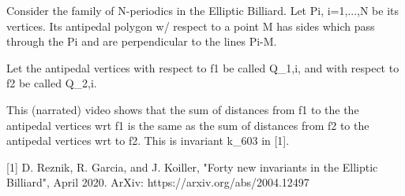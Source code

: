 Consider the family of N-periodics in the Elliptic Billiard. Let Pi, i=1,...,N be its vertices. Its antipedal polygon w/ respect to a point M has sides which pass through the Pi and are perpendicular to the lines Pi-M.

Let the antipedal vertices with respect to f1 be called Q_{1,i}, and with respect to f2 be called Q_{2,i}.

This (narrated) video shows that the sum of distances from f1 to the the antipedal vertices wrt f1 is the same as the sum of distances from f2 to the antipedal vertices wrt to f2. This is invariant k_{603} in [1].

[1] D. Reznik, R. Garcia, and J. Koiller, "Forty new invariants in the Elliptic Billiard", April 2020. ArXiv: https://arxiv.org/abs/2004.12497